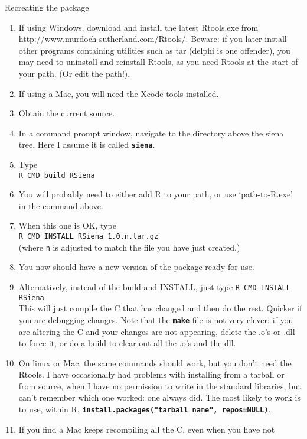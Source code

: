\documentclass[12pt, a4paper]{article}
\makeatletter
\renewcommand{\=}{\,=\,}
\newcommand{\+}{\,+\,}
\newcommand{\sfn}[1]{\textbf{\texttt{#1}}}
\renewcommand{\section}{\@startsection{section}{1}
                {0pt}{\baselineskip}{0.5\baselineskip}
                {\centering\sffamily} }
\makeatother
\begin{document}
\section{Recreating the package}
\begin{enumerate}
\item If using Windows, download and install the latest
\textsf{Rtools.exe} from
  \url{http://www.murdoch-sutherland.com/Rtools/}.  Beware: if you later install
  other programs containing utilities such as tar (delphi is one offender), you
  may need to uninstall and reinstall Rtools, as you need Rtools at the start of
  your path. (Or edit the path!).
\item If using a Mac, you will need the Xcode tools installed.
\item Obtain the current source.
\item In a command prompt window, navigate to the directory above the siena
  tree. Here I assume it is called \sfn{siena}.
\item Type\\
\verb|R CMD build RSiena|
\item You will probably need to either add R to your path, or use
  `path-to-R.exe' in the command above.
\item When this one is OK, type\\
\verb|R CMD INSTALL RSiena_1.0.n.tar.gz|\\
(where \verb|n| is adjusted to match the file you have just created.)
\item You now should have a new version of the package ready for use.
\item Alternatively, instead of the build and INSTALL, just type
\verb|R CMD INSTALL RSiena|\\
This will just compile the C that has changed and then do the rest.
Quicker if you are debugging changes. Note that the \sfn{make} file is not very
clever: if you are altering the C and your changes are not appearing, delete the
.o's or .dll to force it, or do a build
to clear out all the .o's and the dll.
\item On linux or Mac, the same commands should work, but you don't need the
  Rtools. I have occasionally had problems with installing from a tarball or
  from source, when I have no permission to write in the standard libraries, but
  can't remember which one worked: one always did. The most likely to work is to
  use, within R, \sfn{install.packages("tarball name", repos=NULL)}.
\item If you find a Mac keeps recompiling all the C, even when you have not

\end{enumerate}
\end{document}
